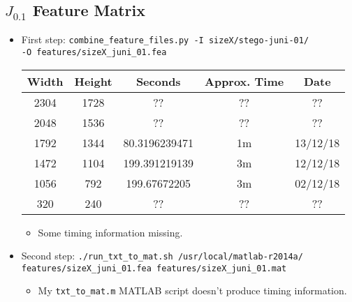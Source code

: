 \documentclass[11pt,a4paper]{report}
\begin{document}
\subsection{$J_{0.1}$ Feature Matrix}
\begin{itemize}
\item First step: \texttt{combine\_feature\_files.py -I sizeX/stego-juni-01/} \\
         \texttt{-O features/sizeX\_juni\_01.fea}
  \begin{center}
  \begin{tabular}{ c c | c c c }
  Width & Height & Seconds & Approx. Time & Date \\ \hline
  2304 & 1728 & ?? & ?? & ?? \\
  2048 & 1536 & ?? & ?? & ?? \\
  1792 & 1344 & 80.3196239471 & 1m & 13/12/18 \\
  1472 & 1104 & 199.391219139 & 3m & 12/12/18 \\
  1056 & 792 & 199.67672205 & 3m & 02/12/18 \\
  320 & 240 & ?? & ?? & ?? \\
  \end{tabular}
  \end{center}
  \begin{itemize}
  \item Some timing information missing.
  \end{itemize}

\item Second step: \texttt{./run\_txt\_to\_mat.sh /usr/local/matlab-r2014a/} \\
         \texttt{features/sizeX\_juni\_01.fea features/sizeX\_juni\_01.mat}
  \begin{itemize}
  \item My \texttt{txt\_to\_mat.m} MATLAB script doesn't produce timing information.
  \end{itemize}
\end{itemize}
\end{document}
